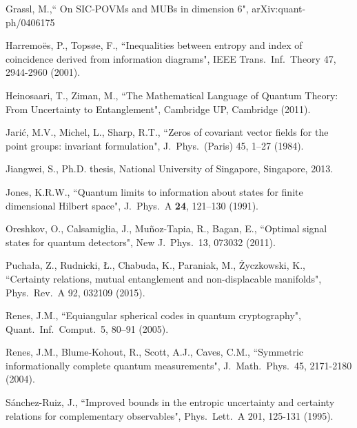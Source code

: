 \documentclass[11pt]{article}
\theoremstyle{remark}
\theoremstyle{definition}
\begin{document}
\begin{thebibliography}{99}

 Grassl, M.,`` On SIC-POVMs and MUBs in dimension 6", arXiv:quant-ph/0406175

 Harremo\"es, P., Tops\o e, F., ``Inequalities between entropy and index of coincidence derived from information diagrams", IEEE Trans.\ Inf.\ Theory 47, 2944-2960
(2001).

 Heinosaari, T., Ziman, M., ``The Mathematical Language
of Quantum Theory: From Uncertainty to Entanglement", Cambridge UP, Cambridge (2011).

Jari\'{c}, M.V., Michel, L., Sharp, R.T., ``Zeros of covariant
vector fields for the point groups: invariant formulation", J.\ Phys.\ (Paris) 45, 1--27 (1984).

 Jiangwei, S., Ph.D. thesis, National University of Singapore, Singapore, 2013.

Jones, K.R.W., ``Quantum limits to information about states for
finite dimensional Hilbert space", J.\ Phys.\ A \textbf{24}, 121--130 (1991).



 Oreshkov, O., Calsamiglia, J., Mu\~{n}oz-Tapia, R., Bagan, E., ``Optimal signal states for quantum detectors", New J.\ Phys.\ 13, 073032 (2011).

 Pucha\l a, Z., Rudnicki, \L., Chabuda, K., Paraniak, M., \.Zyczkowski, K., ``Certainty relations, mutual entanglement and non-displacable manifolds", Phys.\ Rev.\ A 92, 032109 (2015).

 Renes, J.M., ``Equiangular spherical codes in quantum cryptography", Quant.\ Inf.\ Comput.\ 5, 80–91 (2005).

 Renes, J.M., Blume-Kohout, R., Scott, A.J., Caves, C.M., ``Symmetric informationally complete quantum measurements", J.\ Math.\ Phys.\ 45, 2171-2180 (2004).

 S\'anchez-Ruiz, J., ``Improved bounds in the entropic uncertainty and certainty relations for complementary observables", Phys.\ Lett.\ A 201, 125-131 (1995). 


\end{thebibliography}
\end{document}

